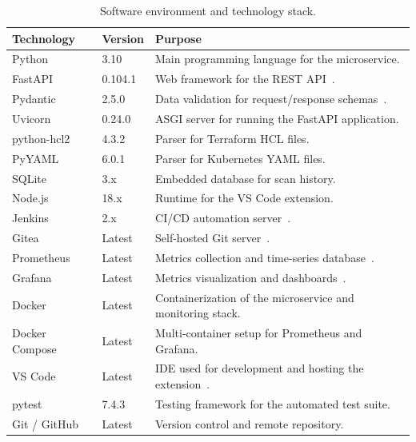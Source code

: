 \begin{table}[H]
\centering
\begin{tabularx}{\textwidth}{|l|l|X|}
\hline
\textbf{Technology} & \textbf{Version} & \textbf{Purpose} \\
\hline
Python         & 3.10       & Main programming language for the microservice. \\
\hline
FastAPI        & 0.104.1    & Web framework for the REST API~\cite{fastapi2024docs}. \\
\hline
Pydantic       & 2.5.0      & Data validation for request/response schemas~\cite{pydantic2024docs}. \\
\hline
Uvicorn        & 0.24.0     & ASGI server for running the FastAPI application. \\
\hline
python-hcl2    & 4.3.2      & Parser for Terraform HCL files. \\
\hline
PyYAML         & 6.0.1      & Parser for Kubernetes YAML files. \\
\hline
SQLite         & 3.x        & Embedded database for scan history. \\
\hline
Node.js        & 18.x       & Runtime for the VS Code extension. \\
\hline
Jenkins        & 2.x        & CI/CD automation server~\cite{jenkins2024docs}. \\
\hline
Gitea          & Latest     & Self-hosted Git server~\cite{gitea2024docs}. \\
\hline
Prometheus     & Latest     & Metrics collection and time-series database~\cite{prometheus2024docs}. \\
\hline
Grafana        & Latest     & Metrics visualization and dashboards~\cite{grafana2024docs}. \\
\hline
Docker         & Latest     & Containerization of the microservice and monitoring stack. \\
\hline
Docker Compose & Latest     & Multi-container setup for Prometheus and Grafana. \\
\hline
VS Code        & Latest     & IDE used for development and hosting the extension~\cite{vscode2024api}. \\
\hline
pytest         & 7.4.3      & Testing framework for the automated test suite. \\
\hline
Git / GitHub   & Latest     & Version control and remote repository. \\
\hline
\end{tabularx}
\caption{Software environment and technology stack.}
\label{tab:software}
\end{table}


